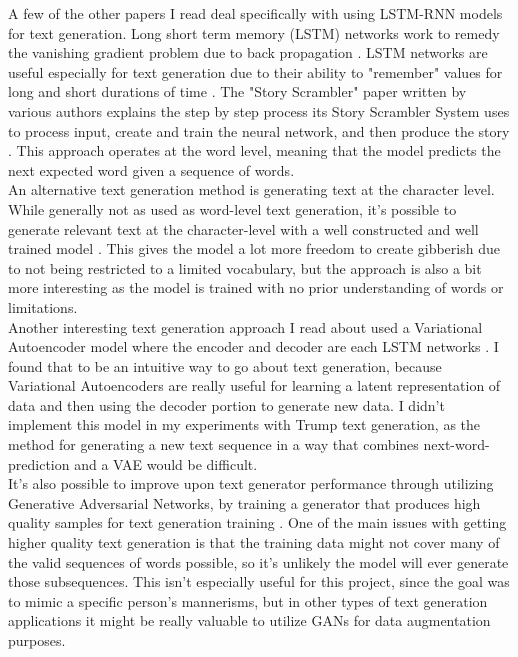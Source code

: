 \documentclass[a4paper]{article}
\begin{document}
\noindent 
A few of the other papers I read deal specifically with using LSTM-RNN models for text generation. Long short term memory (LSTM) networks work to remedy the vanishing gradient problem due to back propagation \cite{C}. LSTM networks are useful especially for text generation due to their ability to "remember" values for long and short durations of time \cite{SS}. The "Story Scrambler" paper written by various authors explains the step by step process its Story Scrambler System uses to process input, create and train the neural network, and then produce the story \cite{SS}.  This approach operates at the word level, meaning that the model predicts the next expected word given a sequence of words. \\

\noindent
An alternative text generation method is generating text at the character level. While generally not as used as word-level text generation, it's possible to generate relevant text at the character-level with a well constructed and well trained model \cite{CL}. This gives the model a lot more freedom to create gibberish due to not being restricted to a limited vocabulary, but the approach is also a bit more interesting as the model is trained with no prior understanding of words or limitations. \\

\noindent
Another interesting text generation approach I read about used a Variational Autoencoder model where the encoder and decoder are each LSTM networks \cite{VAE}. I found that to be an intuitive way to go about text generation, because Variational Autoencoders are really useful for learning a latent representation of data and then using the decoder portion to generate new data. I didn't implement this model in my experiments with Trump text generation, as the method for generating a new text sequence in a way that combines next-word-prediction and a VAE would be difficult. \\

\noindent
It's also possible to improve upon text generator performance through utilizing Generative Adversarial Networks, by training a generator that produces high quality samples for text generation training \cite{GAN}. One of the main issues with getting higher quality text generation is that the training data might not cover many of the valid sequences of words possible, so it's unlikely the model will ever generate those subsequences. This isn't especially useful for this project, since the goal was to mimic a specific person's mannerisms, but in other types of text generation applications it might be really valuable to utilize GANs for data augmentation purposes. \\
\end{document}

